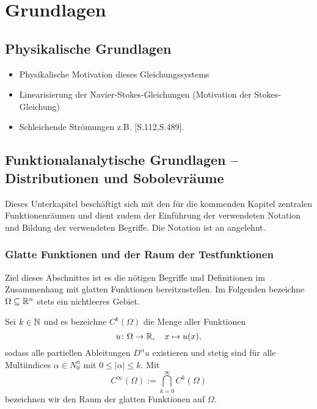 \chapter{Grundlagen}
\label{cp:grundlagen}

\section{Physikalische Grundlagen}

\begin{itemize}
  \item Physikalische Motivation dieses Gleichungssystems
  \item Linearisierung der Navier-Stokes-Gleichungen (Motivation der Stokes-Gleichung)
  \item Schleichende Strömungen z.B. \cite{spurk10stroemungslehre}[S.112,S.489]. 
\end{itemize}

\section{Funktionalanalytische Grundlagen -- Distributionen und Sobolevräume}

Dieses Unterkapitel beschäftigt sich mit den für die kommenden Kapitel zentralen Funktionenräumen und dient zudem der Einführung der verwendeten Notation und Bildung der verwendeten Begriffe.
Die Notation ist an \cite{sohr2001navier} angelehnt.

\subsection{Glatte Funktionen und der Raum der Testfunktionen}
\label{subsec:smooth}

Ziel dieses Abschnittes ist es die nötigen Begriffe und Definitionen im Zusammenhang mit glatten Funktionen bereitzustellen.
Im Folgenden bezeichne $\Omega \subseteq \mathbb{R}^n$ stets ein nichtleeres Gebiet.

Sei $k \in \mathbb{N}$ und es bezeichne $C^k(\Omega)$ die Menge aller Funktionen
$$
u \colon \Omega \to \mathbb{R}, \quad x \mapsto u(x),
$$
sodass alle partiellen Ableitungen $D^\alpha u$ existieren und stetig sind für alle Multiindices $\alpha \in N_0^n$ mit $0 \leq |\alpha| \leq k$. Mit
$$
  C^\infty(\Omega) := \bigcap_{k = 0}^\infty C^k(\Omega)
$$
bezeichnen wir den Raum der glatten Funktionen auf $\Omega$.

